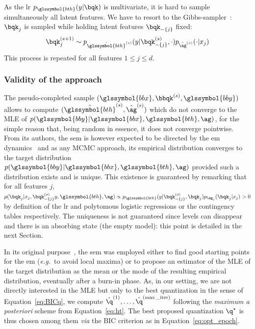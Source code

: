 As the \gls{lr} $p_{\glssymbol{bth}}(y | \bqk)$ is multivariate, it is hard to sample simultaneously all latent features. We have to resort to the Gibbs-sampler~\cite{casella1992explaining}: $\bqk_j$ is sampled while holding latent features $\bqk_{-\{j\}}$ fixed:
\begin{equation} \label{eq:q_draw}
\bqk_j^{(s+1)} \sim p_{\hat{\glssymbol{bth}}^{(s)}}(y | \bqk_{-\{j\}}^{(s)}, \cdot) p_{\hat{\ag}^{(s)}}(\cdot | x_j)
\end{equation}
This process is repeated for all features $1 \leq j \leq d$.



\subsubsection{Validity of the approach}

The pseudo-completed sample $(\glssymbol{bbx}, \bbqk^{(s)}, \glssymbol{bby})$ allows to compute $(\hat{\glssymbol{bth}}^{(s)},\hat{\ag}^{(s)})$ which do not converge to the MLE of $p(\glssymbol{bby} | \glssymbol{bbx}, \glssymbol{bth}, \ag)$, for the simple reason that, being random in essence, it does not converge pointwise. From its authors, the \gls{sem} is however expected to be directed by the \gls{em} dynamics~\cite{celeux_sem} and as any MCMC approach, its empirical distribution converges to the target distribution $p(\glssymbol{bby} | \glssymbol{bbx}, \glssymbol{bth}, \ag)$ provided such a distribution exists and is unique. This existence is guaranteed by remarking that for all features $j$, $ p(\bqk_j | x_j, \bqk^{(s)}_{-\{j\}} y, \glssymbol{bth}, \ag) \propto p_{\glssymbol{bth}}(y | \bqk^{(s)}_{-\{j\}}, \bqk_j) p_{\ag_j}(\bqk_j | x_j) > 0 $ by definition of the \gls{lr} and polytomous logistic regressions or the contingency tables respectively. The uniqueness is not guaranteed since levels can disappear and there is an absorbing state (the empty model): this point is detailed in the next Section.

In its original purpose~\cite{celeux_sem}, the \gls{sem} was employed either to find good starting points for the \gls{em} (\textit{e.g.}\ to avoid local maxima) or to propose an estimator of the MLE of the target distribution as the mean or the mode of the resulting empirical distribution, eventually after a burn-in phase. As, in our setting, we are not directly interested in the MLE but only to the best quantization in the sense of Equation~\eqref{eq:BICq}, we compute $\hat{\q}^{(1)}, \dots, \hat{\q}^{(\max\_{\text{iter}})}$ following the \textit{maximum a posteriori} scheme from Equation~\eqref{eq:ht}. The best proposed quantization $\q^\star$ is thus chosen among them \textit{via} the BIC criterion as in Equation~\eqref{eq:opt_epoch}.


